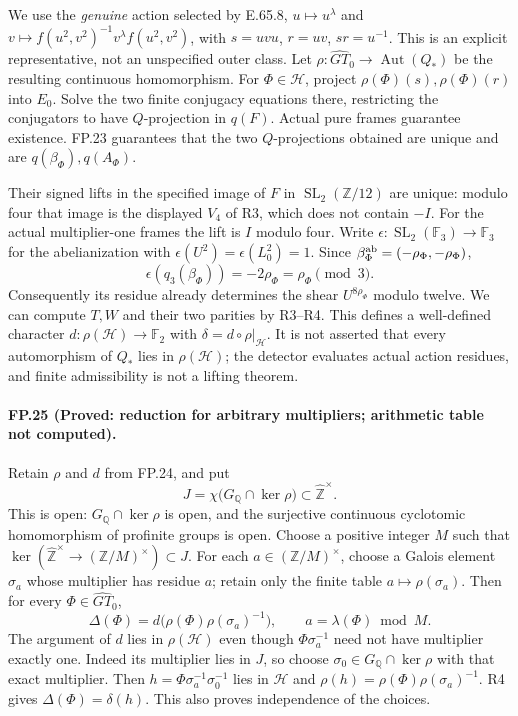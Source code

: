 We use the \emph{genuine} action selected by E.65.8,
$u\mapsto u^\lambda$ and
$v\mapsto f(u^2,v^2)^{-1}v^\lambda f(u^2,v^2)$, with
$s=uvu$, $r=uv$, $sr=u^{-1}$.
This is an explicit representative, not an unspecified outer class.
Let $\rho:\widehat{GT}_0\to\operatorname{Aut}(Q_*)$ be the resulting
continuous homomorphism. For $\Phi\in\mathcal H$, project
$\rho(\Phi)(s),\rho(\Phi)(r)$ into $E_0$. Solve the two finite
conjugacy equations there, restricting the conjugators to have
$Q$-projection in $q(F)$. Actual pure frames guarantee existence.
FP.23 guarantees that the two $Q$-projections obtained are unique and
are $q(\beta_\Phi),q(A_\Phi)$.

Their signed lifts in the specified image of $F$ in
$\operatorname{SL}_2(\mathbb Z/12)$ are unique: modulo four that image
is the displayed $V_4$ of R3, which does not contain $-I$.
For the actual multiplier-one frames the lift is $I$ modulo four.
Write $\epsilon:\operatorname{SL}_2(\mathbb F_3)\to\mathbb F_3$
for the abelianization with $\epsilon(U^2)=\epsilon(L_0^2)=1$.
Since $\beta_\Phi^{\rm ab}=(-\rho_\Phi,-\rho_\Phi)$,
\[
 \epsilon(q_3(\beta_\Phi))=-2\rho_\Phi=\rho_\Phi\pmod3.
\]
Consequently its residue already determines the shear $U^{8\rho_\Phi}$
modulo twelve. We can compute $T,W$ and their two parities by R3--R4.
This defines a well-defined character
$d:\rho(\mathcal H)\to\mathbb F_2$ with
$\delta=d\circ\rho|_{\mathcal H}$.
It is not asserted that every automorphism of $Q_*$ lies in
$\rho(\mathcal H)$; the detector evaluates actual action residues,
and finite admissibility is not a lifting theorem.

\paragraph{FP.25 (Proved: reduction for arbitrary multipliers; arithmetic table not computed).}
Retain $\rho$ and $d$ from FP.24, and put
\[
 J=\chi\bigl(G_{\mathbb Q}\cap\ker\rho\bigr)
       \subset\widehat{\mathbb Z}^{\times}.
\]
This is open: $G_{\mathbb Q}\cap\ker\rho$ is open, and the surjective
continuous cyclotomic homomorphism of profinite groups is open.
Choose a positive integer $M$ such that
$\ker(\widehat{\mathbb Z}^{\times}\to(\mathbb Z/M)^\times)\subset J$.
For each $a\in(\mathbb Z/M)^\times$, choose a Galois element $\sigma_a$
whose multiplier has residue $a$; retain only the finite table
$a\mapsto\rho(\sigma_a)$. Then for every
$\Phi\in\widehat{GT}_0$,
\[
 \Delta(\Phi)=d\bigl(\rho(\Phi)\rho(\sigma_a)^{-1}\bigr),
 \qquad a=\lambda(\Phi)\bmod M.
\]
The argument of $d$ lies in $\rho(\mathcal H)$ even though
$\Phi\sigma_a^{-1}$ need not have multiplier exactly one.
Indeed its multiplier lies in $J$, so choose
$\sigma_0\in G_{\mathbb Q}\cap\ker\rho$ with that exact multiplier.
Then $h=\Phi\sigma_a^{-1}\sigma_0^{-1}$ lies in $\mathcal H$ and
$\rho(h)=\rho(\Phi)\rho(\sigma_a)^{-1}$. R4 gives
$\Delta(\Phi)=\delta(h)$. This also proves independence of the choices.

